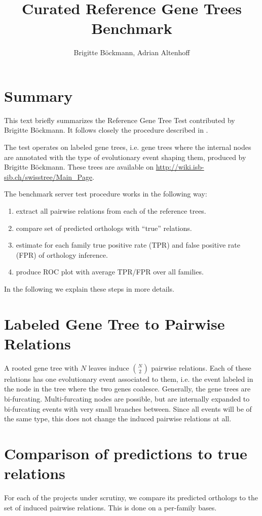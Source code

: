 \documentclass[a4paper,11pt]{article}
\title{Curated Reference Gene Trees Benchmark}
\author{Brigitte Böckmann, Adrian Altenhoff}
\begin{document}
\maketitle

\section*{Summary}
This text briefly summarizes the Reference Gene Tree Test contributed by Brigitte Böckmann. It follows closely the procedure described in \cite{Boeckmann2011}.

The test operates on labeled gene trees, i.e. gene trees where the internal nodes are annotated with the type of evolutionary event shaping them, produced by Brigitte Böckmann. These trees are available on \url{http://wiki.isb-sib.ch/swisstree/Main_Page}.

The benchmark server test procedure works in the following way:
\begin{enumerate}
\item extract all pairwise relations from each of the reference trees.
\item compare set of predicted orthologs with ``true'' relations. 
\item estimate for each family true positive rate (TPR) and false positive rate (FPR) of orthology inference.
\item produce ROC plot with average TPR/FPR over all families.
\end{enumerate}

In the following we explain these steps in more details.

\section*{Labeled Gene Tree to Pairwise Relations}
A rooted gene tree with $N$ leaves induce $\binom{N}{2}$ pairwise relations.
Each of these relations has one evolutionary event associated to them, i.e. the event labeled in the node in the tree where the two genes coalesce. Generally, the gene trees are bi-furcating. Multi-furcating nodes are possible, but are internally expanded to bi-furcating events with very small branches between. Since all events will be of the same type, this does not change the induced pairwise relations at all.

\section*{Comparison of predictions to true relations}
For each of the projects under scrutiny, we compare its predicted orthologs to the set of induced pairwise relations. This is done on a per-family bases. 
\end{document}
